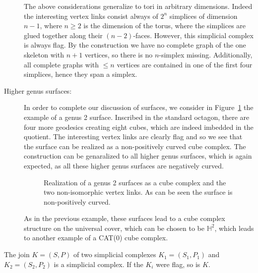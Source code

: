 \begin{bsp}
\begin{description}
    The above considerations generalize to tori in arbitrary dimensions. Indeed the interesting vertex links consist always of \(2^n\) simplices of dimension \(n-1\), where \(n\geq2\) is the dimension of the torus, where the simplices are glued together along their \((n-2)\)-faces. However, this simplicial complex is always flag. By the construction we have no complete graph of the one skeleton with \(n+1\) vertices, so there is no \(n\)-simplex missing. Additionally, all complete graphs with \(\leq n\) vertices are contained in one of the first four simplices, hence they span a simplex.
  \item[Higher genus surfaces:] In order to complete our discussion of surfaces, we consider in Figure~\ref{fig:genus-2} the example of a genus 2 surface. Inscribed in the standard octagon, there are four more geodesics creating eight cubes, which are indeed imbedded in the quotient. The interesting vertex links are clearly flag and so we see that the surface can be realized as a non-positively curved cube complex. The construction can be genaralized to all higher genus surfaces, which is again expected, as all these higher genus surfaces are negatively curved.
    \begin{figure}[htbp]
      \centering
      
      \caption{Realization of a genus 2 surfaces as a cube complex and the two non-isomorphic vertex links. As can be seen the surface is non-positively curved.}
      \label{fig:genus-2}
    \end{figure}

    As in the previous example, these surfaces lead to a cube complex structure on the universal cover, which can be chosen to be \(\mathbb{H}^2\), which leads to another example of a CAT(0) cube complex.
  \end{description}
\end{bsp}

\begin{lemma}
  \label{lem:flag}
  The join \(K = (S,P)\) of two simplicial complexes \(K_1 = (S_1, P_1)\) and \(K_2 = (S_2, P_2)\) is a simplicial complex. If the \(K_i\) were flag, so is \(K\).
\end{lemma}

